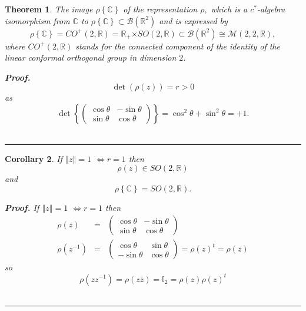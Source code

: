 \documentclass[aps,preprint]{revtex4}
\newtheorem{theorem}{Theorem}
\newtheorem{corollary}[theorem]{Corollary}
\newenvironment{proof}[1][Proof]{\noindent\textbf{#1.} }{\ \rule{0.5em}{0.5em}}
\begin{document}
\begin{theorem}
The image $\rho \left\{ \mathbb{C}\right\} $ of the representation $\rho ,$
which is a $c^{\ast }$-algebra isomorphism from $\mathbb{C}$ to $\rho
\left\{ \mathbb{C}\right\} \subset \mathcal{B}\left( \mathbb{R}^{2}\right) $
and is expressed by 
\begin{equation}
\rho \left\{ \mathbb{C}\right\} =CO^{+}\left( 2,\mathbb{R}\right) =\mathbb{R}%
_{+}\mathbb{\times }SO\left( 2,\mathbb{R}\right) \subset \mathcal{B}\left( 
\mathbb{R}^{2}\right) \cong \mathcal{M}\left( 2,2,\mathbb{R}\right) ,
\end{equation}%
where $CO^{+}\left( 2,\mathbb{R}\right) $ stands for the \emph{connected
component of the identity of the linear} \emph{conformal orthogonal group}
in dimension $2$.

\begin{proof}
\begin{equation}
\det \left( \rho \left( z\right) \right) =r>0
\end{equation}%
as 
\begin{equation}
\det \left\{ \left( 
\begin{array}{cc}
\cos \theta & -\sin \theta \\ 
\sin \theta & \cos \theta%
\end{array}%
\right) \right\} =\cos ^{2}\theta +\sin ^{2}\theta =+1.
\end{equation}
\end{proof}
\end{theorem}

\begin{corollary}
If $\left\Vert z\right\Vert =1$ $\Leftrightarrow r=1$ then%
\begin{equation}
\rho \left( z\right) \in SO\left( 2,\mathbb{R}\right)
\end{equation}%
and 
\begin{equation}
\rho \left\{ \mathbb{C}\right\} =SO\left( 2,\mathbb{R}\right) .
\end{equation}

\begin{proof}
If $\left\Vert z\right\Vert =1$ $\Leftrightarrow r=1$ then 
\begin{eqnarray}
\rho \left( z\right) &=&\left( 
\begin{array}{cc}
\cos \theta & -\sin \theta \\ 
\sin \theta & \cos \theta%
\end{array}%
\right) \\
\rho \left( z^{-1}\right) &=&\left( 
\begin{array}{cc}
\cos \theta & \sin \theta \\ 
-\sin \theta & \cos \theta%
\end{array}%
\right) =\rho \left( z\right) ^{t}=\rho \left( \overline{z}\right)
\end{eqnarray}%
so 
\begin{equation}
\rho \left( zz^{-1}\right) =\rho \left( z\overline{z}\right) =\mathbb{I}%
_{2}=\rho \left( z\right) \rho \left( z\right) ^{t}
\end{equation}
\end{proof}
\end{corollary}
\end{document}
